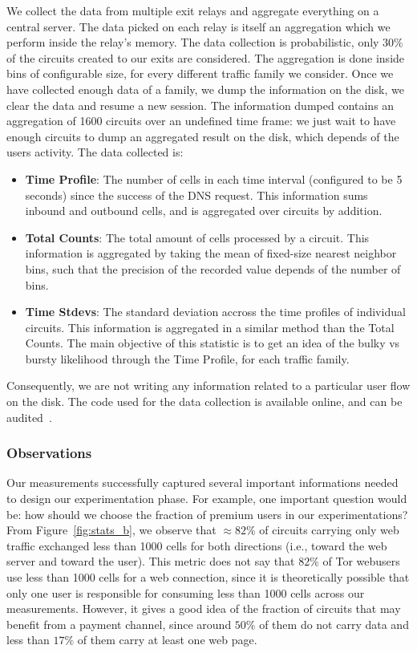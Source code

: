 We collect the data from multiple exit relays and aggregate everything on a central server. The data picked on each relay is itself an aggregation which we perform inside the relay's memory. The data collection is probabilistic, only 30\% of the circuits created to our exits are considered. The aggregation is done inside bins of configurable size, for every different traffic family we consider. Once we have collected enough data of a family, we dump the information on the disk, we clear the data and resume a new session. The information dumped contains an aggregation of 1600 circuits over an undefined time frame: we just wait to have enough circuits to dump an aggregated result on the disk, which depends of the users activity. The data collected is:
\begin{itemize}
	\item \textbf{Time Profile}: The number of cells in each time interval (configured to be 5 seconds) since the success of the DNS request. This information sums inbound and outbound cells, and is aggregated over circuits by addition.
	\item \textbf{Total Counts}: The total amount of cells processed by a circuit. This information is aggregated by taking the mean of fixed-size nearest neighbor bins, such that the precision of the recorded value depends of the number of bins.
	\item \textbf{Time Stdevs}: The standard deviation accross the time profiles of individual circuits. This information is aggregated in a similar method than the Total Counts. The main objective of this statistic is to get an idea of the bulky vs bursty likelihood through the Time Profile, for each traffic family.
\end{itemize}
Consequently, we are not writing any information related to a particular user flow on the disk. The code used for the data collection is available online, and can be audited~\cite{code-mt_stats}.

\subsubsection{Observations}

Our measurements successfully captured several important informations needed to design our experimentation phase. For example, one important question would be: how should we choose the fraction of premium users in our experimentations? From Figure~\ref{fig:stats_b}, we observe that $\approx 82\%$ of circuits carrying only web traffic exchanged less than 1000 cells for both directions (i.e., toward the web server and toward the user). This metric does not say that $82\%$ of Tor webusers use less than 1000 cells for a web connection, since it is theoretically possible that only one user is responsible for consuming less than 1000 cells across our measurements. However, it gives a good idea of the fraction of circuits that may benefit from a payment channel, since around $50\%$ of them do not carry data and less than $17\%$ of them carry at least one web page.


